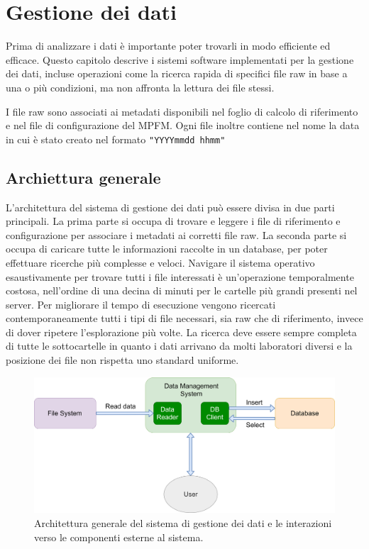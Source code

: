 \chapter{Gestione dei dati}


Prima di analizzare i dati è importante poter trovarli in modo efficiente ed efficace. Questo capitolo descrive i sistemi software implementati per la gestione dei dati, incluse operazioni come la ricerca rapida di specifici file raw in base a una o più condizioni, ma non affronta la lettura dei file stessi.

I file raw sono associati ai metadati disponibili nel foglio di calcolo di riferimento e nel file di configurazione del MPFM. Ogni file inoltre contiene nel nome la data in cui è stato creato nel formato \texttt{"YYYYmmdd hhmm"}

\section{Archiettura generale}
L'architettura del sistema di gestione dei dati può essere divisa in due parti principali. La prima parte si occupa di trovare e leggere i file di riferimento e configurazione per associare i metadati ai corretti file raw. La seconda parte si occupa di caricare tutte le informazioni raccolte in un database, per poter effettuare ricerche più complesse e veloci.
Navigare il sistema operativo esaustivamente per trovare tutti i file interessati è un'operazione temporalmente costosa, nell'ordine di una decina di minuti per le cartelle più grandi presenti nel server. Per migliorare il tempo di esecuzione vengono ricercati contemporaneamente tutti i tipi di file necessari, sia raw che di riferimento, invece di dover ripetere l'esplorazione più volte.
La ricerca deve essere sempre completa di tutte le sottocartelle in quanto i dati arrivano da molti laboratori diversi e la posizione dei file non rispetta uno standard uniforme.


\begin{figure}
	\includegraphics[width=\textwidth]{figures/ArchitetturaDMD}
	\caption[Architettura sistema di gestione dei dai]{Architettura generale del sistema di gestione dei dati e le interazioni verso le componenti esterne al sistema. 
		\label{fig:ArchietturaDMD}}
\end{figure}

